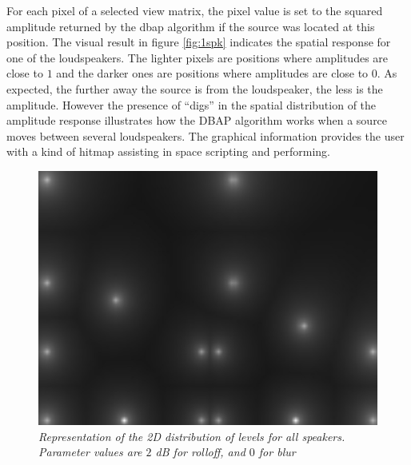 \documentclass[twoside,10pt]{article}
\begin{document}
For each pixel of a selected view matrix, the pixel value is set to the squared amplitude returned by the dbap algorithm if the source was located at this position. The visual result in figure \ref{fig:1spk} indicates the spatial response for one of the loudspeakers. The lighter pixels are positions where amplitudes are close to $1$ and the darker ones are positions where amplitudes are close to $0$. As expected, the further away the source is from the loudspeaker, the less is the amplitude. However the presence of ``digs'' in the spatial distribution of the amplitude response illustrates how the DBAP algorithm works when a source moves between several loudspeakers. The graphical information provides the user with a kind of hitmap assisting in space scripting and performing.

\begin{figure}[ht]
\centerline{\includegraphics[scale=0.5]{all_r_2_b_0}}
\caption{{\it Representation of the 2D distribution of levels for all speakers. Parameter values are $2$ dB for rolloff, and $0$ for blur}}  
\label{fig:allspk1}
\end{figure}
\end{document}
